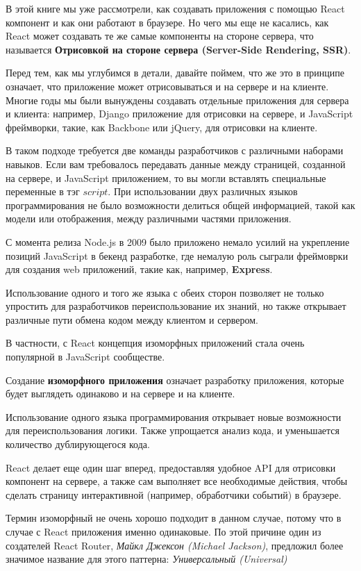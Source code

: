 В этой книге мы уже рассмотрели, как создавать приложения с помощью React компонент и как они работают в браузере. Но чего мы еще не касались, как React может создавать те же самые компоненты на стороне сервера, что называется \textbf{Отрисовкой на стороне сервера (Server-Side Rendering, SSR)}.

Перед тем, как мы углубимся в детали, давайте поймем, что же это в принципе означает, что приложение может отрисовываться и на сервере и на клиенте. Многие годы мы были вынуждены создавать отдельные приложения для сервера и клиента: например, Django приложение для отрисовки на сервере, и JavaScript фреймворки, такие, как Backbone или jQuery, для отрисовки на клиенте. 

В таком подходе требуется две команды разработчиков с различными наборами навыков. Если вам требовалось передавать данные между страницей, созданной на сервере, и JavaScript приложением, то вы могли вставлять специальные переменные в тэг $script$. При использовании двух различных языков программирования не было возможности делиться общей информацией, такой как модели или отображения, между различными частями приложения.

С момента релиза Node.js в 2009 было приложено немало усилий на укрепление позиций JavaScript в бекенд разработке, где немалую роль сыграли фреймоврки для создания web приложений, такие как, например, \textbf{Express}.

Использование одного и того же языка с обеих сторон позволяет не только упростить для разработчиков переиспользование их знаний, но также открывает различные пути обмена кодом между клиентом и сервером.

В частности, с React концепция изоморфных приложений стала очень популярной в JavaScript сообществе.

Создание \textbf{изоморфного приложения} означает разработку приложения, которые будет выглядеть одинаково и на сервере и на клиенте.

Использование одного языка программирования открывает новые возможности для переиспользования логики. Также упрощается анализ кода, и уменьшается количество дублирующегося кода.

React делает еще один шаг вперед, предоставляя удобное API для отрисовки компонент на сервере, а также сам выполняет все необходимые действия, чтобы сделать страницу интерактивной (например, обработчики событий) в браузере.

Термин изоморфный не очень хорошо подходит в данном случае, потому что в случае с React приложения именно одинаковые. По этой причине один из создателей React Router, \textit{Майкл Джексон (Michael Jackson)}, предложил более значимое название для этого паттерна: \textit{Универсальный (Universal)}

